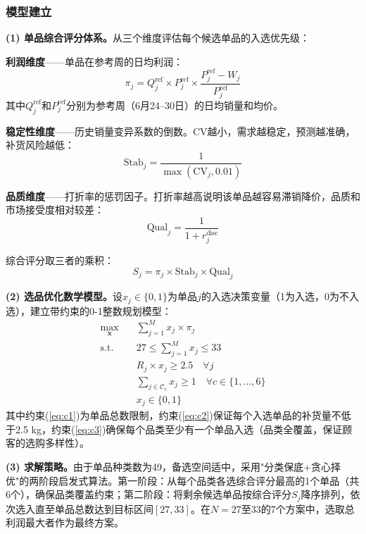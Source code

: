 \documentclass[12pt,a4paper]{ctexart}
\begin{document}
\subsubsection{模型建立}

\textbf{(1) 单品综合评分体系。}从三个维度评估每个候选单品的入选优先级：

\textbf{利润维度}——单品在参考周的日均利润：
\begin{equation}
    \pi_j = Q_j^{\text{ref}} \times P_j^{\text{ref}} \times \frac{P_j^{\text{ref}} - W_j}{P_j^{\text{ref}}}
\end{equation}
其中$Q_j^{\text{ref}}$和$P_j^{\text{ref}}$分别为参考周（6月24--30日）的日均销量和均价。

\textbf{稳定性维度}——历史销量变异系数的倒数。CV越小，需求越稳定，预测越准确，补货风险越低：
\begin{equation}
    \text{Stab}_j = \frac{1}{\max(\text{CV}_j, 0.01)}
\end{equation}

\textbf{品质维度}——打折率的惩罚因子。打折率越高说明该单品越容易滞销降价，品质和市场接受度相对较差：
\begin{equation}
    \text{Qual}_j = \frac{1}{1 + r_j^{\text{disc}}}
\end{equation}

综合评分取三者的乘积：
\begin{equation}
    S_j = \pi_j \times \text{Stab}_j \times \text{Qual}_j
    \label{eq:composite}
\end{equation}

\textbf{(2) 选品优化数学模型。}设$x_j \in \{0,1\}$为单品$j$的入选决策变量（1为入选，0为不入选），建立带约束的0-1整数规划模型：
\begin{align}
    \max_{\mathbf{x}} &\quad \sum_{j=1}^{M} x_j \times \pi_j \label{eq:obj} \\
    \text{s.t.} &\quad 27 \le \sum_{j=1}^{M} x_j \le 33 \label{eq:c1} \\
    &\quad R_j \times x_j \ge 2.5 \quad \forall j \label{eq:c2} \\
    &\quad \sum_{j \in \mathcal{C}_c} x_j \ge 1 \quad \forall c \in \{1,\ldots,6\} \label{eq:c3} \\
    &\quad x_j \in \{0,1\}
\end{align}
其中约束(\ref{eq:c1})为单品总数限制，约束(\ref{eq:c2})保证每个入选单品的补货量不低于2.5 kg，约束(\ref{eq:c3})确保每个品类至少有一个单品入选（品类全覆盖，保证顾客的选购多样性）。

\textbf{(3) 求解策略。}由于单品种类数为49，备选空间适中，采用"分类保底+贪心择优"的两阶段启发式算法。第一阶段：从每个品类各选综合评分最高的1个单品（共6个），确保品类覆盖约束；第二阶段：将剩余候选单品按综合评分$S_j$降序排列，依次选入直至单品总数达到目标区间$[27,33]$。在$N=27$至$33$的7个方案中，选取总利润最大者作为最终方案。
\end{document}
